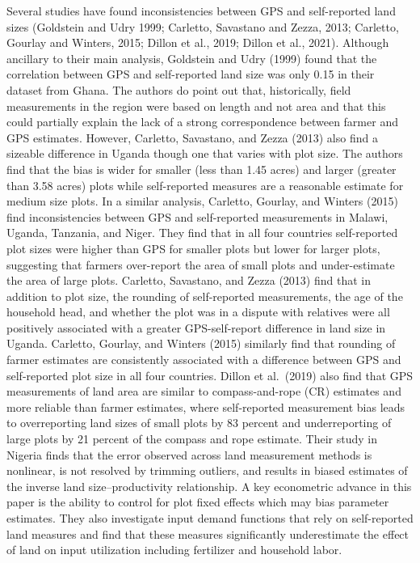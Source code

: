 \documentclass[
]{book}
\begin{document}
Several studies have found inconsistencies between GPS and self-reported land sizes (Goldstein and Udry 1999; Carletto, Savastano and Zezza, 2013; Carletto, Gourlay and Winters, 2015; Dillon et al., 2019; Dillon et al., 2021). Although ancillary to their main analysis, Goldstein and Udry (1999) found that the correlation between GPS and self-reported land size was only 0.15 in their dataset from Ghana. The authors do point out that, historically, field measurements in the region were based on length and not area and that this could partially explain the lack of a strong correspondence between farmer and GPS estimates. However, Carletto, Savastano, and Zezza (2013) also find a sizeable difference in Uganda though one that varies with plot size. The authors find that the bias is wider for smaller (less than 1.45 acres) and larger (greater than 3.58 acres) plots while self-reported measures are a reasonable estimate for medium size plots. In a similar analysis, Carletto, Gourlay, and Winters (2015) find inconsistencies between GPS and self-reported measurements in Malawi, Uganda, Tanzania, and Niger. They find that in all four countries self-reported plot sizes were higher than GPS for smaller plots but lower for larger plots, suggesting that farmers over-report the area of small plots and under-estimate the area of large plots. Carletto, Savastano, and Zezza (2013) find that in addition to plot size, the rounding of self-reported measurements, the age of the household head, and whether the plot was in a dispute with relatives were all positively associated with a greater GPS-self-report difference in land size in Uganda. Carletto, Gourlay, and Winters (2015) similarly find that rounding of farmer estimates are consistently associated with a difference between GPS and self-reported plot size in all four countries. Dillon et al.~(2019) also find that GPS measurements of land area are similar to compass-and-rope (CR) estimates and more reliable than farmer estimates, where self-reported measurement bias leads to overreporting land sizes of small plots by 83 percent and underreporting of large plots by 21 percent of the compass and rope estimate. Their study in Nigeria finds that the error observed across land measurement methods is nonlinear, is not resolved by trimming outliers, and results in biased estimates of the inverse land size--productivity relationship. A key econometric advance in this paper is the ability to control for plot fixed effects which may bias parameter estimates. They also investigate input demand functions that rely on self-reported land measures and find that these measures significantly underestimate the effect of land on input utilization including fertilizer and household labor.
\end{document}
